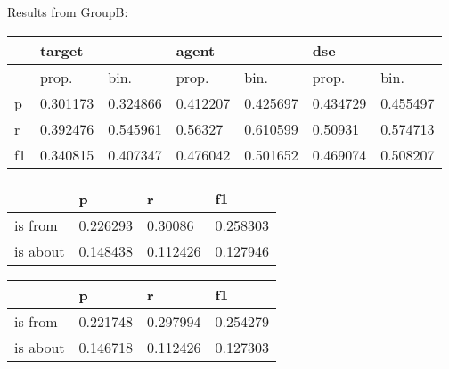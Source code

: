 \documentclass[a4paper, 12pt]{article}
\begin{document}
Results from GroupB:\\
\begin{table}[h!]
\centering
{}

\begin{tabular}{l|ll|ll|ll}
\hline
   & \multicolumn{2}{l}{target} & \multicolumn{2}{l}{agent} & \multicolumn{2}{l}{dse} \\ \hline
   & prop.& bin.& prop.& bin.& prop.& bin.\\
 \hline
p  &0.301173&0.324866& 0.412207 & 0.425697&0.434729  & 0.455497  \\
r  &0.392476&0.545961&  0.56327 & 0.610599& 0.50931  & 0.574713  \\
f1 &0.340815&0.407347& 0.476042 & 0.501652&0.469074  & 0.508207  \\ \hline
\end{tabular}

\centering
{}

\begin{tabular}{l|l|l|l}
\hline
         & p & r & f1    \\\hline
is from  & 0.226293&  0.30086& 0.258303\\
is about &0.148438& 0.112426& 0.127946\\
\hline
\end{tabular}
\centering
{}

\begin{tabular}{l|l|l|l}
\hline
         & p & r & f1    \\\hline
is from  & 0.221748& 0.297994& 0.254279\\
is about &0.146718& 0.112426& 0.127303\\
\hline
\end{tabular}
\end{table}
\end{document}

